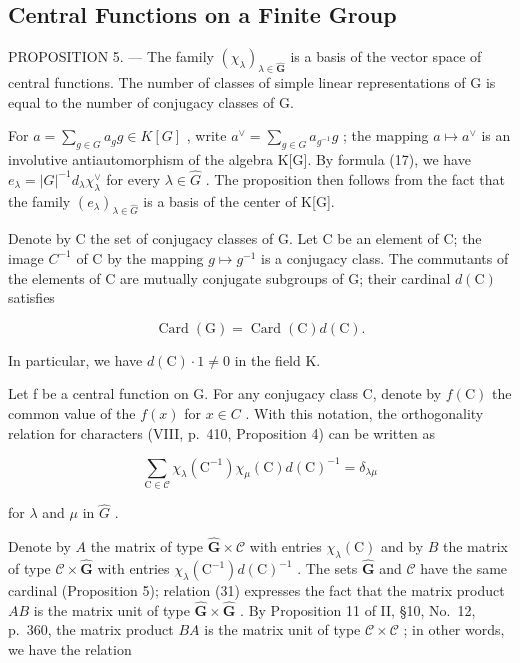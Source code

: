 \subsection{Central Functions on a Finite Group}

PROPOSITION 5. --- The family \((\chi_{\lambda})_{\lambda\in\widehat{\mathbf{G}}}\) is a basis of the vector space of central functions. The number of classes of simple linear representations of G is equal to the number of conjugacy classes of G.

For \(a = \sum_{g \in G} a_g g \in K[G]\) , write \(a^\vee = \sum_{g \in G} a_{g^{-1}} g\) ; the mapping \(a \mapsto a^\vee\) is an involutive antiautomorphism of the algebra K{[}G{]}. By formula (17), we have \(e_\lambda = |G|^{-1} d_\lambda \chi_\lambda^\vee\) for every \(\lambda \in \widehat{G}\) . The proposition then follows from the fact that the family \((e_\lambda)_{\lambda \in \widehat{G}}\) is a basis of the center of K{[}G{]}.

Denote by C the set of conjugacy classes of G. Let C be an element of C; the image \(C^{-1}\) of C by the mapping \(g \mapsto g^{-1}\) is a conjugacy class. The commutants of the elements of C are mutually conjugate subgroups of G; their cardinal \(d(\mathrm{C})\) satisfies

\[
\operatorname{Card} (\mathrm{G}) = \operatorname{Card} (\mathrm{C}) d (\mathrm{C}).\tag{30}
\]

In particular, we have \(d(\mathrm{C}) \cdot 1 \neq 0\) in the field K.

Let f be a central function on G. For any conjugacy class C, denote by \(f(\mathrm{C})\) the common value of the \(f(x)\) for \(x \in C\) . With this notation, the orthogonality relation for characters (VIII, p.~410, Proposition 4) can be written as

\[
\sum_ {\mathrm{C} \in \mathcal {C}} \chi_ {\lambda} (\mathrm{C} ^ {- 1}) \chi_ {\mu} (\mathrm{C}) d (\mathrm{C}) ^ {- 1} = \delta_ {\lambda \mu}\tag{31}
\]

for \(\lambda\) and \(\mu\) in \(\widehat{G}\) .

Denote by \(A\) the matrix of type \(\widehat{\mathbf{G}} \times \mathcal{C}\) with entries \(\chi_{\lambda}(\mathrm{C})\) and by \(B\) the matrix of type \(\mathcal{C} \times \widehat{\mathbf{G}}\) with entries \(\chi_{\lambda}(\mathrm{C}^{-1}) d(\mathrm{C})^{-1}\) . The sets \(\widehat{\mathbf{G}}\) and \(\mathcal{C}\) have the same cardinal (Proposition 5); relation (31) expresses the fact that the matrix product \(AB\) is the matrix unit of type \(\widehat{\mathbf{G}} \times \widehat{\mathbf{G}}\) . By Proposition 11 of II, §10, No.~12, p.~360, the matrix product \(BA\) is the matrix unit of type \(\mathcal{C} \times \mathcal{C}\) ; in other words, we have the relation

